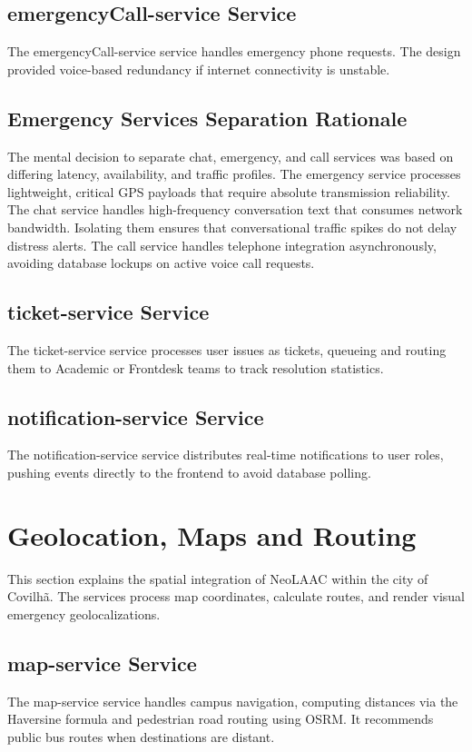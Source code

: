 \documentclass[12pt]{article}
\begin{document}
\subsection{emergencyCall-service Service}
The emergencyCall-service service handles emergency phone requests. The design provided voice-based redundancy if internet connectivity is unstable.

\subsection{Emergency Services Separation Rationale}
The mental decision to separate chat, emergency, and call services was based on differing latency, availability, and traffic profiles. The emergency service processes lightweight, critical GPS payloads that require absolute transmission reliability. The chat service handles high-frequency conversation text that consumes network bandwidth. Isolating them ensures that conversational traffic spikes do not delay distress alerts. The call service handles telephone integration asynchronously, avoiding database lockups on active voice call requests.

\subsection{ticket-service Service}
The ticket-service service processes user issues as tickets, queueing and routing them to Academic or Frontdesk teams to track resolution statistics.

\subsection{notification-service Service}
The notification-service service distributes real-time notifications to user roles, pushing events directly to the frontend to avoid database polling.

\section{Geolocation, Maps and Routing}
This section explains the spatial integration of NeoLAAC within the city of Covilhã. The services process map coordinates, calculate routes, and render visual emergency geolocalizations.

\subsection{map-service Service}
The map-service service handles campus navigation, computing distances via the Haversine formula and pedestrian road routing using OSRM. It recommends public bus routes when destinations are distant.
\end{document}
